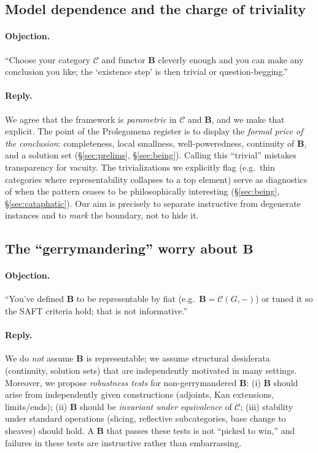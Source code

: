 \documentclass[11pt]{article}
\theoremstyle{upright}
\begin{document}
\subsection{Model dependence and the charge of triviality}
\paragraph{Objection.}
“Choose your category \(\mathcal C\) and functor \(\mathbf B\) cleverly enough and you can make any conclusion you like; the `existence step' is then trivial or question-begging.”

\paragraph{Reply.}
We agree that the framework is \emph{parametric} in \(\mathcal C\) and \(\mathbf B\), and we make that explicit. The point of the Prolegomena register is to display the \emph{formal price of the conclusion}: completeness, local smallness, well-poweredness, continuity of \(\mathbf B\), and a solution set (\S\ref{sec:prelims}, \S\ref{sec:being}). Calling this “trivial” mistakes transparency for vacuity. The trivializations we explicitly flag (e.g.\ thin categories where representability collapses to a top element) serve as diagnostics of when the pattern ceases to be philosophically interesting (\S\ref{sec:being}, \S\ref{sec:cataphatic}). Our aim is precisely to separate instructive from degenerate instances and to \emph{mark} the boundary, not to hide it.

\subsection{The “gerrymandering” worry about \texorpdfstring{$\mathbf B$}{B}}
\paragraph{Objection.}
“You’ve defined \(\mathbf B\) to be representable by fiat (e.g.\ \(\mathbf B=\mathcal C(G,-)\)) or tuned it so the SAFT criteria hold; that is not informative.”

\paragraph{Reply.}
We do \emph{not} assume \(\mathbf B\) is representable; we assume structural desiderata (continuity, solution sets) that are independently motivated in many settings. Moreover, we propose \emph{robustness tests} for non-gerrymandered \(\mathbf B\): (i) \(\mathbf B\) should arise from independently given constructions (adjoints, Kan extensions, limits/ends); (ii) \(\mathbf B\) should be \emph{invariant under equivalence} of \(\mathcal C\); (iii) stability under standard operations (slicing, reflective subcategories, base change to sheaves) should hold. A \(\mathbf B\) that passes these tests is not “picked to win,” and failures in these tests are instructive rather than embarrassing.
\end{document}
